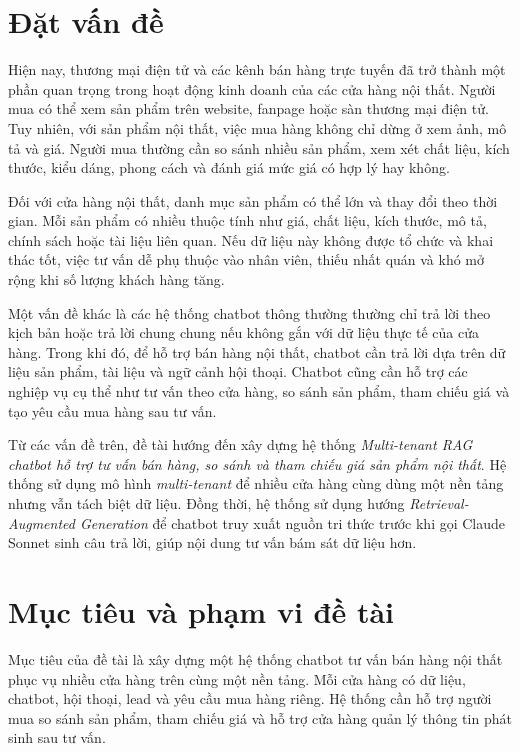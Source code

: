 \documentclass[../DoAn.tex]{subfiles}
\begin{document}
\section{Đặt vấn đề}
\label{section:1.1}

Hiện nay, thương mại điện tử và các kênh bán hàng trực tuyến đã trở thành một phần quan trọng trong hoạt động kinh doanh của các cửa hàng nội thất. Người mua có thể xem sản phẩm trên website, fanpage hoặc sàn thương mại điện tử. Tuy nhiên, với sản phẩm nội thất, việc mua hàng không chỉ dừng ở xem ảnh, mô tả và giá. Người mua thường cần so sánh nhiều sản phẩm, xem xét chất liệu, kích thước, kiểu dáng, phong cách và đánh giá mức giá có hợp lý hay không.

Đối với cửa hàng nội thất, danh mục sản phẩm có thể lớn và thay đổi theo thời gian. Mỗi sản phẩm có nhiều thuộc tính như giá, chất liệu, kích thước, mô tả, chính sách hoặc tài liệu liên quan. Nếu dữ liệu này không được tổ chức và khai thác tốt, việc tư vấn dễ phụ thuộc vào nhân viên, thiếu nhất quán và khó mở rộng khi số lượng khách hàng tăng.

Một vấn đề khác là các hệ thống chatbot thông thường thường chỉ trả lời theo kịch bản hoặc trả lời chung chung nếu không gắn với dữ liệu thực tế của cửa hàng. Trong khi đó, để hỗ trợ bán hàng nội thất, chatbot cần trả lời dựa trên dữ liệu sản phẩm, tài liệu và ngữ cảnh hội thoại. Chatbot cũng cần hỗ trợ các nghiệp vụ cụ thể như tư vấn theo cửa hàng, so sánh sản phẩm, tham chiếu giá và tạo yêu cầu mua hàng sau tư vấn.

Từ các vấn đề trên, đề tài hướng đến xây dựng hệ thống \textit{Multi-tenant RAG chatbot hỗ trợ tư vấn bán hàng, so sánh và tham chiếu giá sản phẩm nội thất}. Hệ thống sử dụng mô hình \textit{multi-tenant} để nhiều cửa hàng cùng dùng một nền tảng nhưng vẫn tách biệt dữ liệu. Đồng thời, hệ thống sử dụng hướng \textit{Retrieval-Augmented Generation} để chatbot truy xuất nguồn tri thức trước khi gọi Claude Sonnet sinh câu trả lời, giúp nội dung tư vấn bám sát dữ liệu hơn.

\section{Mục tiêu và phạm vi đề tài}
\label{section:1.2}

Mục tiêu của đề tài là xây dựng một hệ thống chatbot tư vấn bán hàng nội thất phục vụ nhiều cửa hàng trên cùng một nền tảng. Mỗi cửa hàng có dữ liệu, chatbot, hội thoại, lead và yêu cầu mua hàng riêng. Hệ thống cần hỗ trợ người mua so sánh sản phẩm, tham chiếu giá và hỗ trợ cửa hàng quản lý thông tin phát sinh sau tư vấn.
\end{document}
